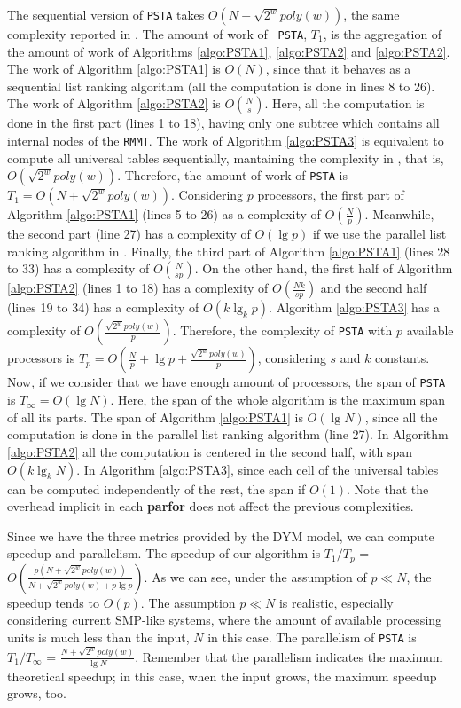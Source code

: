The sequential version of {\tt PSTA} takes $O(N+\sqrt{2^{w}}poly(w))$,
the same complexity reported in
\cite{Navarro:2014:FFS:2620785.2601073}. The amount of work of {\tt
PSTA}, $T_1$, is the aggregation of the amount of work of Algorithms \ref{algo:PSTA1},
\ref{algo:PSTA2} and \ref{algo:PSTA2}. The work of Algorithm \ref{algo:PSTA1} is $O(N)$,
since that it behaves as a sequential list ranking algorithm (all the computation is
done in lines 8 to 26). The work of Algorithm \ref{algo:PSTA2} is $O(\frac{N}{s})$. Here,
all the computation is done in the first part (lines 1 to 18), having only one
subtree which contains all internal nodes of the {\tt RMMT}. The work of Algorithm \ref{algo:PSTA3} is equivalent to compute all universal tables sequentially, mantaining
the complexity in \cite{Navarro:2014:FFS:2620785.2601073}, that is, $O(\sqrt{2^{w}}poly(w))$. Therefore, the amount of work of {\tt PSTA} is $T_{1}=O(N+\sqrt{2^{w}}poly(w))$. Considering $p$ processors, the first part of Algorithm \ref{algo:PSTA1} (lines 5 to 26) as a complexity of $O(\frac{N}{p})$. Meanwhile, the second part (line 27) has a complexity of $O(\lg p)$ if we use the parallel list ranking algorithm in \cite{Reif1993}. Finally, the third part of Algorithm \ref{algo:PSTA1} (lines 28 to 33) has a complexity of $O(\frac{N}{sp})$. On the other hand, the first half of Algorithm \ref{algo:PSTA2} (lines 1 to 18) has a complexity of $O(\frac{Nk}{sp})$ and the second half (lines 19 to 34) has a complexity of $O(k\lg_{k}p)$. Algorithm \ref{algo:PSTA3} has a complexity of $O(\frac{\sqrt{2^{w}}poly(w)}{p})$. Therefore, the complexity of {\tt PSTA} with $p$ available processors is $T_p =
O(\frac{N}{p}+\lg p+\frac{\sqrt{2^{w}}poly(w)}{p})$, considering $s$ and $k$ constants. Now, if we consider that we have enough amount of processors, the span of {\tt PSTA} is $T_{\infty}=O(\lg N)$. Here, the span of the whole algorithm is the maximum span of all its parts. The span of Algorithm \ref{algo:PSTA1} is $O(\lg N)$, since all the computation is done in the parallel list ranking algorithm (line 27). In Algorithm \ref{algo:PSTA2} all the computation is centered in the second half, with span $O(k\lg_{k}N)$. In Algorithm \ref{algo:PSTA3}, since each cell of the universal tables can be computed independently of the rest, the span if $O(1)$. Note that the overhead implicit in each {\bf parfor} does not affect the previous complexities.

Since we have the three metrics provided by the DYM model, we can
compute speedup and parallelism. The speedup of our algorithm is $T_1/T_p$ =
$O(\frac{p(N+\sqrt{2^{w}}poly(w))}{N+\sqrt{2^{w}}poly(w)+p\lg p})$. As we can see,
under the assumption of $p\ll N$, the speedup tends to $O(p)$. The assumption
$p\ll N$ is realistic, especially considering current SMP-like
systems, where the amount of available processing units is much less than the
input, $N$ in this case. The parallelism of {\tt PSTA} is $T_1/T_{\infty}$ =
$\frac{N+\sqrt{2^{w}}poly(w)}{\lg N}$. Remember that the parallelism indicates the maximum theoretical speedup; in this case, when the input grows, the maximum speedup grows, too.

